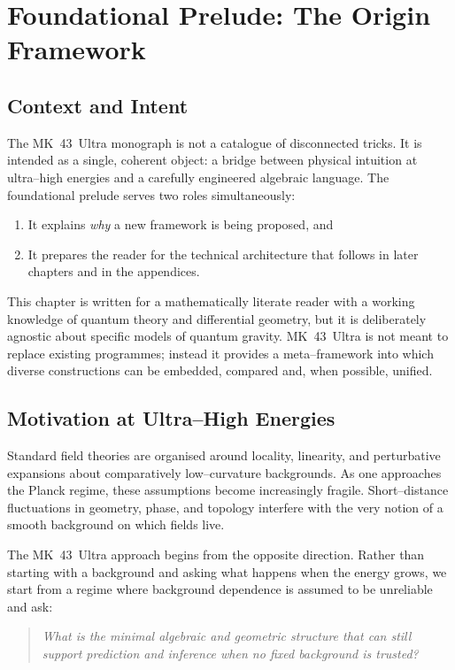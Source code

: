

\chapter{Foundational Prelude: The Origin Framework}
\label{ch:origin-framework}

\section{Context and Intent}
The MK~43~Ultra monograph is not a catalogue of disconnected tricks. It is
intended as a single, coherent object: a bridge between physical intuition at
ultra--high energies and a carefully engineered algebraic language. The
foundational prelude serves two roles simultaneously:
\begin{enumerate}
  \item It explains \emph{why} a new framework is being proposed, and
  \item It prepares the reader for the technical architecture that follows
        in later chapters and in the appendices.
\end{enumerate}

This chapter is written for a mathematically literate reader with a working
knowledge of quantum theory and differential geometry, but it is deliberately
agnostic about specific models of quantum gravity. MK~43~Ultra is not meant
to replace existing programmes; instead it provides a meta--framework into
which diverse constructions can be embedded, compared and, when possible,
unified.

\section{Motivation at Ultra--High Energies}
Standard field theories are organised around locality, linearity, and
perturbative expansions about comparatively low--curvature backgrounds.
As one approaches the Planck regime, these assumptions become increasingly
fragile. Short--distance fluctuations in geometry, phase, and topology
interfere with the very notion of a smooth background on which fields live.

The MK~43~Ultra approach begins from the opposite direction. Rather than
starting with a background and asking what happens when the energy grows, we
start from a regime where background dependence is assumed to be unreliable
and ask:
\begin{quote}
\emph{What is the minimal algebraic and geometric structure that can still
support prediction and inference when no fixed background is trusted?}
\end{quote}

